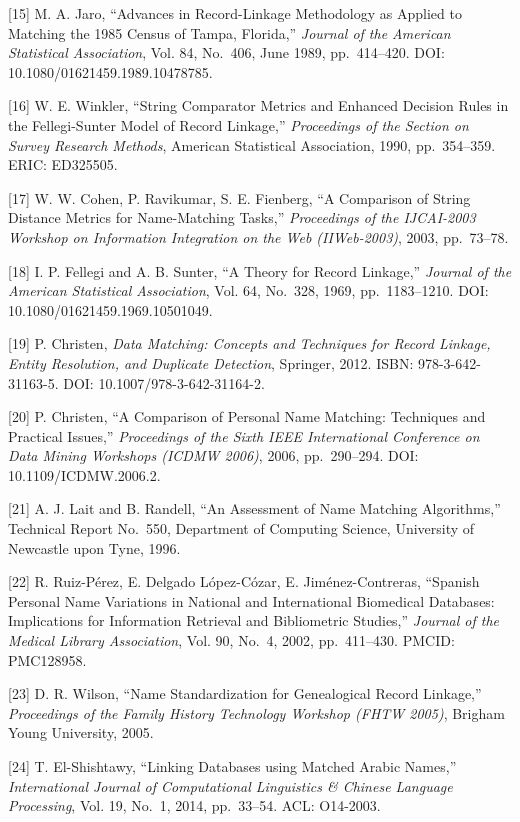 \documentclass[
  11pt,
]{article}
\begin{document}
{[}15{]} M. A. Jaro, ``Advances in Record-Linkage Methodology as Applied
to Matching the 1985 Census of Tampa, Florida,'' \emph{Journal of the
American Statistical Association}, Vol. 84, No.~406, June 1989,
pp.~414--420. DOI: 10.1080/01621459.1989.10478785.

{[}16{]} W. E. Winkler, ``String Comparator Metrics and Enhanced
Decision Rules in the Fellegi-Sunter Model of Record Linkage,''
\emph{Proceedings of the Section on Survey Research Methods}, American
Statistical Association, 1990, pp.~354--359. ERIC: ED325505.

{[}17{]} W. W. Cohen, P. Ravikumar, S. E. Fienberg, ``A Comparison of
String Distance Metrics for Name-Matching Tasks,'' \emph{Proceedings of
the IJCAI-2003 Workshop on Information Integration on the Web
(IIWeb-2003)}, 2003, pp.~73--78.

{[}18{]} I. P. Fellegi and A. B. Sunter, ``A Theory for Record
Linkage,'' \emph{Journal of the American Statistical Association}, Vol.
64, No.~328, 1969, pp.~1183--1210. DOI: 10.1080/01621459.1969.10501049.

{[}19{]} P. Christen, \emph{Data Matching: Concepts and Techniques for
Record Linkage, Entity Resolution, and Duplicate Detection}, Springer,
2012. ISBN: 978-3-642-31163-5. DOI: 10.1007/978-3-642-31164-2.

{[}20{]} P. Christen, ``A Comparison of Personal Name Matching:
Techniques and Practical Issues,'' \emph{Proceedings of the Sixth IEEE
International Conference on Data Mining Workshops (ICDMW 2006)}, 2006,
pp.~290--294. DOI: 10.1109/ICDMW.2006.2.

{[}21{]} A. J. Lait and B. Randell, ``An Assessment of Name Matching
Algorithms,'' Technical Report No.~550, Department of Computing Science,
University of Newcastle upon Tyne, 1996.

{[}22{]} R. Ruiz-P\'erez, E. Delgado L\'opez-C\'ozar, E. Jim\'enez-Contreras,
``Spanish Personal Name Variations in National and International
Biomedical Databases: Implications for Information Retrieval and
Bibliometric Studies,'' \emph{Journal of the Medical Library
Association}, Vol. 90, No.~4, 2002, pp.~411--430. PMCID: PMC128958.

{[}23{]} D. R. Wilson, ``Name Standardization for Genealogical Record
Linkage,'' \emph{Proceedings of the Family History Technology Workshop
(FHTW 2005)}, Brigham Young University, 2005.

{[}24{]} T. El-Shishtawy, ``Linking Databases using Matched Arabic
Names,'' \emph{International Journal of Computational Linguistics \&
Chinese Language Processing}, Vol. 19, No.~1, 2014, pp.~33--54. ACL:
O14-2003.
\end{document}
